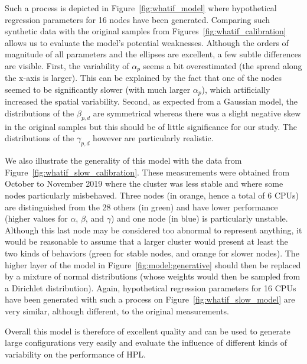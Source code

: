             Such a process is depicted in Figure~\ref{fig:whatif_model} where hypothetical regression parameters for 16
            nodes have been generated. Comparing such synthetic data with the original samples from
            Figures~\ref{fig:whatif_calibration} allows us to evaluate the model's potential weaknesses. Although the
            orders of magnitude of all parameters and the ellipses are excellent, a few subtle differences are visible.
            First, the variability of \(\alpha_{p}\) seems a bit overestimated (the spread along the x-axis is larger).
            This can be explained by the fact that one of the nodes seemed to be significantly slower (with much larger
            \(\alpha_{p}\)), which artificially increased the spatial variability. Second, as expected from a Gaussian
            model, the distributions of the \(\beta_{p,d}\) are symmetrical whereas there was a slight negative skew in
            the original samples but this should be of little significance for our study. The distributions of the
            \(\gamma_{p,d}\) however are particularly realistic.

            We also illustrate the generality of this model with the data from Figure~\ref{fig:whatif_slow_calibration}.
            These measurements were obtained from October to November 2019 where the cluster was less stable and where
            some nodes particularly misbehaved. Three nodes (in orange, hence a total of 6 CPUs) are distinguished from
            the 28 others (in green) and have lower performance (higher values for \(\alpha\), \(\beta\), and
            \(\gamma\)) and one node (in blue) is particularly unstable. Although this last node may be considered too
            abnormal to represent anything, it would be reasonable to assume that a larger cluster would present at
            least the two kinds of behaviors (green for stable nodes, and orange for slower nodes). The higher layer of
            the model in Figure~\ref{fig:model:generative} should then be replaced by a mixture of normal distributions
            (whose weights would then be sampled from a Dirichlet distribution). Again, hypothetical regression
            parameters for 16 CPUs have been generated with such a process on Figure~\ref{fig:whatif_slow_model} are
            very similar, although different, to the original measurements.

            Overall this model is therefore of excellent quality and can be used to generate large configurations very
            easily and evaluate the influence of different kinds of variability on the performance of HPL.

